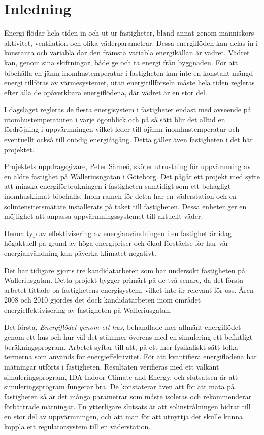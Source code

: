 \chapter{Inledning}

Energi flödar hela tiden in och ut ur fastigheter, bland annat genom människors aktivitet, ventilation och olika väderparametrar. Dessa energiflöden kan delas in i konstanta och variabla där den främsta variabla energikällan är vädret. Vädret kan, genom sina skiftningar, både ge och ta energi från byggnaden. För att bibehålla en jämn inomhustemperatur i fastigheten kan inte en konstant mängd energi tillföras av värmesystemet, utan energitillförseln måste hela tiden regleras efter alla de opåverkbara energiflödena, där vädret är en stor del.

I dagsläget regleras de flesta energisystem i fastigheter endast med avseende på utomhustemperaturen i varje ögonblick och på så sätt blir det alltid en fördröjning i uppvärmningen vilket leder till ojämn inomhustemperatur och eventuellt också till onödig energiåtgång. Detta gäller även fastigheten i det här projektet.

Projektets uppdragsgivare, Peter Särneö, sköter utrustning för uppvärmning av en äldre fastighet på Walleriusngatan i Göteborg. Det pågår ett projekt med syfte att minska energiförbrukningen i fastigheten samtidigt som ett behagligt inomhusklimat bibehålls. Inom ramen för detta har en väderstation och en solintensitetsmätare installerats på taket till fastigheten. Dessa enheter ger en möjlighet att anpassa uppvärmningssystemet till aktuellt  väder. %

Denna typ av effektivisering av energianvändningen i en fastighet är idag högaktuell på grund av höga energipriser och ökad förståelse för hur vår energianvändning kan påverka klimatet negativt.

Det har tidigare gjorts tre kandidatarbeten som har undersökt fastigheten på Walleriusgatan. Detta projekt bygger primärt på de två senare, då det första arbetet tittade på fastighetens energisystem, vilket inte är relevant för oss. Åren 2008 och 2010 gjordes det dock kandidatarbeten inom området energieffektivisering av fastigheten på Walleriusgatan. 

Det första, \textit{Energiflödet genom ett hus}\cite{kandidatarbete2008},
behandlade mer allmänt energiflödet genom ett hus och hur väl det stämmer
överens med en simulering ett befintligt beräkningsprogram. Arbetet syftar
till att, på ett mer fysikaliskt sätt tolka termerna som används för
energieffektivitet. För att kvantifiera energiflödena har mätningar utförts i
fastigheten. Resultaten verifieras med ett välkänt simuleringsprogram,
IDA Indoor Climate and Energy, och slutsatsen är att simuleringsprogram fungerar bra.
De konstaterar även att för att mäta på fastigheten så är det många parametrar som
måste isoleras och rekommenderar förbättrade mätningar.
 En ytterligare slutsats är att solinstrålningen bidrar till en stor del av
uppvärmningen, och att man för att utnyttja det skulle kunna koppla ett
regulatorsystem till en väderstation.


